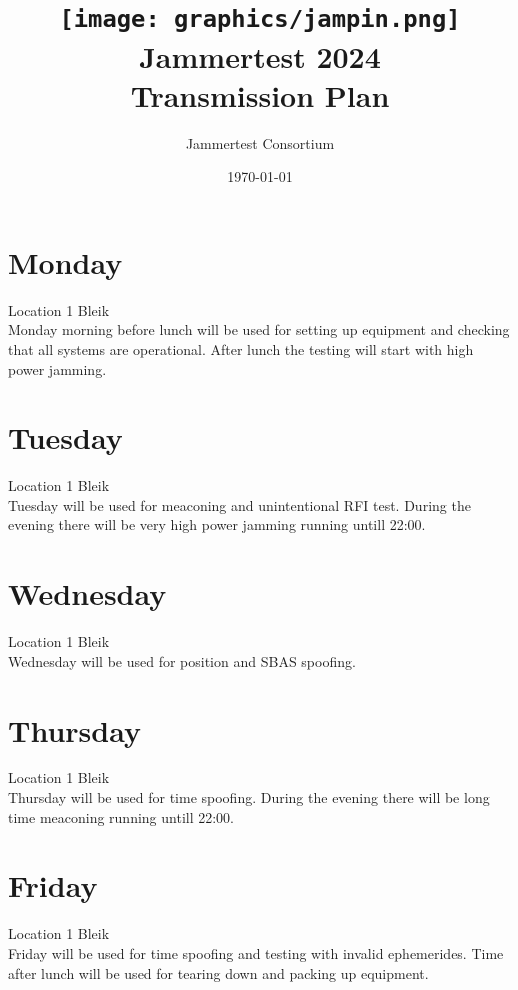 \documentclass[a4paper]{book}
\title{\texttt{[image: graphics/jampin.png]}\\ Jammertest 2024 \\ \huge{Transmission Plan}}
\author{Jammertest Consortium}
\date{\today \\ \DTMcurrenttime}
\begin{document}
\maketitle

\tableofcontents
\restoregeometry

\begin{landscape}

\chapter{Monday}
\Large Location 1 Bleik \\
Monday morning before lunch will be used for setting up equipment and checking that all systems are operational. After lunch the testing will start with high power jamming.

%

\chapter{Tuesday}
\Large Location 1 Bleik \\
Tuesday will be used for meaconing and unintentional RFI test. During the evening there will be very high power jamming running untill 22:00.

%

\chapter{Wednesday}
\Large Location 1 Bleik \\
Wednesday will be used for position and SBAS spoofing. 

%

\chapter{Thursday}
\Large Location 1 Bleik \\
Thursday will be used for time spoofing. During the evening there will be long time meaconing running untill 22:00.

%

\chapter{Friday}
\Large Location 1 Bleik \\
Friday will be used for time spoofing and testing with invalid ephemerides. Time after lunch will be used for tearing down and packing up equipment.

%

\end{landscape}
\end{document}
